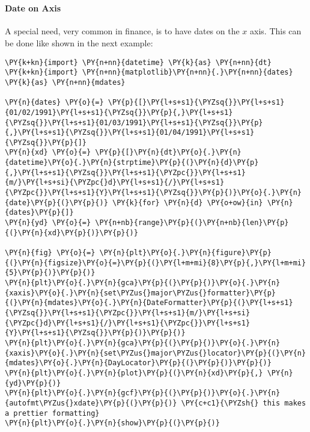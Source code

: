     \begin{center}
    \end{center}
    { \hspace*{\fill} \\}
    
    \hypertarget{date-on-axis}{%
\paragraph{Date on Axis}\label{date-on-axis}}

A special need, very common in finance, is to have dates on the \(x\)
axis. This can be done like shown in the next example:

    \begin{tcolorbox}[breakable, size=fbox, boxrule=1pt, pad at break*=1mm,colback=cellbackground, colframe=cellborder]
\begin{Verbatim}[commandchars=\\\{\}]
\PY{k+kn}{import} \PY{n+nn}{datetime} \PY{k}{as} \PY{n+nn}{dt}
\PY{k+kn}{import} \PY{n+nn}{matplotlib}\PY{n+nn}{.}\PY{n+nn}{dates} \PY{k}{as} \PY{n+nn}{mdates}

\PY{n}{dates} \PY{o}{=} \PY{p}{[}\PY{l+s+s1}{\PYZsq{}}\PY{l+s+s1}{01/02/1991}\PY{l+s+s1}{\PYZsq{}}\PY{p}{,}\PY{l+s+s1}{\PYZsq{}}\PY{l+s+s1}{01/03/1991}\PY{l+s+s1}{\PYZsq{}}\PY{p}{,}\PY{l+s+s1}{\PYZsq{}}\PY{l+s+s1}{01/04/1991}\PY{l+s+s1}{\PYZsq{}}\PY{p}{]}
\PY{n}{xd} \PY{o}{=} \PY{p}{[}\PY{n}{dt}\PY{o}{.}\PY{n}{datetime}\PY{o}{.}\PY{n}{strptime}\PY{p}{(}\PY{n}{d}\PY{p}{,}\PY{l+s+s1}{\PYZsq{}}\PY{l+s+s1}{\PYZpc{}}\PY{l+s+s1}{m/}\PY{l+s+si}{\PYZpc{}d}\PY{l+s+s1}{/}\PY{l+s+s1}{\PYZpc{}}\PY{l+s+s1}{Y}\PY{l+s+s1}{\PYZsq{}}\PY{p}{)}\PY{o}{.}\PY{n}{date}\PY{p}{(}\PY{p}{)} \PY{k}{for} \PY{n}{d} \PY{o+ow}{in} \PY{n}{dates}\PY{p}{]}
\PY{n}{yd} \PY{o}{=} \PY{n+nb}{range}\PY{p}{(}\PY{n+nb}{len}\PY{p}{(}\PY{n}{xd}\PY{p}{)}\PY{p}{)}

\PY{n}{fig} \PY{o}{=} \PY{n}{plt}\PY{o}{.}\PY{n}{figure}\PY{p}{(}\PY{n}{figsize}\PY{o}{=}\PY{p}{(}\PY{l+m+mi}{8}\PY{p}{,}\PY{l+m+mi}{5}\PY{p}{)}\PY{p}{)}
\PY{n}{plt}\PY{o}{.}\PY{n}{gca}\PY{p}{(}\PY{p}{)}\PY{o}{.}\PY{n}{xaxis}\PY{o}{.}\PY{n}{set\PYZus{}major\PYZus{}formatter}\PY{p}{(}\PY{n}{mdates}\PY{o}{.}\PY{n}{DateFormatter}\PY{p}{(}\PY{l+s+s1}{\PYZsq{}}\PY{l+s+s1}{\PYZpc{}}\PY{l+s+s1}{m/}\PY{l+s+si}{\PYZpc{}d}\PY{l+s+s1}{/}\PY{l+s+s1}{\PYZpc{}}\PY{l+s+s1}{Y}\PY{l+s+s1}{\PYZsq{}}\PY{p}{)}\PY{p}{)}
\PY{n}{plt}\PY{o}{.}\PY{n}{gca}\PY{p}{(}\PY{p}{)}\PY{o}{.}\PY{n}{xaxis}\PY{o}{.}\PY{n}{set\PYZus{}major\PYZus{}locator}\PY{p}{(}\PY{n}{mdates}\PY{o}{.}\PY{n}{DayLocator}\PY{p}{(}\PY{p}{)}\PY{p}{)}
\PY{n}{plt}\PY{o}{.}\PY{n}{plot}\PY{p}{(}\PY{n}{xd}\PY{p}{,} \PY{n}{yd}\PY{p}{)}
\PY{n}{plt}\PY{o}{.}\PY{n}{gcf}\PY{p}{(}\PY{p}{)}\PY{o}{.}\PY{n}{autofmt\PYZus{}xdate}\PY{p}{(}\PY{p}{)} \PY{c+c1}{\PYZsh{} this makes a prettier formatting}
\PY{n}{plt}\PY{o}{.}\PY{n}{show}\PY{p}{(}\PY{p}{)}
\end{Verbatim}
\end{tcolorbox}


